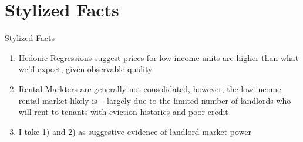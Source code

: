 \documentclass[10pt, xcolor=dvipsnames]{beamer}
\begin{document}
\section{Stylized Facts}

\begin{frame}{Stylized Facts}
    \begin{enumerate}
        \item Hedonic Regressions suggest prices for low income units are higher than what we'd expect, given observable quality
        \item Rental Markters are generally not consolidated, however, the low income rental market likely is -- largely due to the limited number of landlords who will rent to tenants with eviction histories and poor credit
        \item I take 1) and 2) as suggestive evidence of landlord market power
    \end{enumerate}
\end{frame}

    
\end{document}
